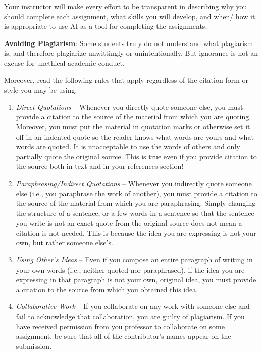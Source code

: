 \documentclass[11pt,]{article}
\begin{document}
Your instructor will make every effort to be transparent in describing
why you should complete each assignment, what skills you will develop,
and when/ how it is appropriate to use AI as a tool for completing the
assignments.

\textbf{Avoiding Plagiarism}: Some students truly do not understand what
plagiarism is, and therefore plagiarize unwittingly or unintentionally.
But ignorance is not an excuse for unethical academic conduct.

Moreover, read the following rules that apply regardless of the citation
form or style you may be using.

\begin{enumerate}
\def\labelenumi{\arabic{enumi}.}
\item
  \emph{Direct Quotations} -- Whenever you directly quote someone else,
  you must provide a citation to the source of the material from which
  you are quoting. Moreover, you must put the material in quotation
  marks or otherwise set it off in an indented quote so the reader knows
  what words are yours and what words are quoted. It is unacceptable to
  use the words of others and only partially quote the original source.
  This is true even if you provide citation to the source both in text
  and in your references section!
\item
  \emph{Paraphrasing/Indirect Quotations} -- Whenever you indirectly
  quote someone else (i.e., you paraphrase the work of another), you
  must provide a citation to the source of the material from which you
  are paraphrasing. Simply changing the structure of a sentence, or a
  few words in a sentence so that the sentence you write is not an exact
  quote from the original source does not mean a citation is not needed.
  This is because the idea you are expressing is not your own, but
  rather someone else's.
\item
  \emph{Using Other's Ideas} -- Even if you compose an entire paragraph
  of writing in your own words (i.e., neither quoted nor paraphrased),
  if the idea you are expressing in that paragraph is not your own,
  original idea, you must provide a citation to the source from which
  you obtained this idea.
\item
  \emph{Collaborative Work} -- If you collaborate on any work with
  someone else and fail to acknowledge that collaboration, you are
  guilty of plagiarism. If you have received permission from you
  professor to collaborate on some assignment, be sure that all of the
  contributor's names appear on the submission.

\end{enumerate}
\end{document}
